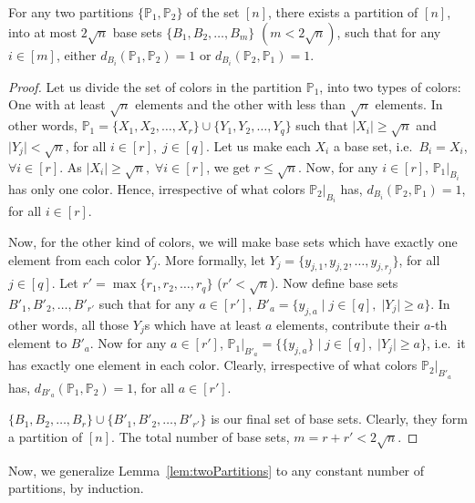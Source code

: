 \documentclass[final,oneeqnum, onethmnum, onefignum]{siamltex1213}
\renewcommand{\P}{\mathbb P}
\newcommand{\abs}[1]{\lvert #1 \rvert}
\begin{document}
\begin{lemma}
\label{lem:twoPartitions}
For any two partitions $\{ \P_1, \P_2 \}$ of the set $[n] $,
there exists a partition of $[n]$,
into at most $2 \sqrt{n}$ base sets $\{B_1, B_2, \dots, B_{m} \}$
 $(m < 2 \sqrt{n})$,
such that for any $i \in [m]$,
either $d_{B_i}(\P_1, \P_2) = 1$ or $d_{B_i}(\P_2, \P_1) =1$.
\end{lemma}          
\begin{proof}
Let us divide the set of colors in the partition $\P_1$, into 
two types of colors: One with at least $\sqrt{n}$ elements and the other with less than
$\sqrt{n}$ elements. 
In other words, $\P_1 = \{X_1, X_2, \dots, X_{r} \} \cup \{ Y_1, Y_2, \dots, Y_{q}\}$
such that $\abs{X_i} \geq \sqrt{n}$ and $\abs{Y_j} < \sqrt{n}$,
 for all $i \in [r], \; j \in [q]$.
Let us make each $X_i$ a base set, i.e.\ $B_i = X_i$, $\forall i \in [r]$. 
As $\abs{X_i} \geq \sqrt{n}, \; \forall i \in [r]$, we get $r \leq \sqrt{n}$.
Now, for any $i \in [r]$, $\P_1|_{B_i}$ has only one color.
Hence, irrespective of what colors $\P_2|_{B_i}$ has, 
$d_{B_i}(\P_2, \P_1) = 1$, for all $i \in [r]$.

Now, for the other kind of colors, we will make base sets  
which have exactly one element from each color $Y_j$.
More formally, let $Y_j = \{y_{j,1}, y_{j,2}, \dots, y_{j, r_j} \}$, for all $j \in [q]$.
Let $r' = \max\{ r_1, r_2, \dots, r_q\}$ ($r' < \sqrt{n}$). 
Now define base sets $B'_1, B'_2, \dots, B'_{r'}$ such that
for any $a \in [r']$, $B'_a = \{y_{j,a} \mid j \in [q], \; \abs{Y_j} \geq a \} $. 
In other words, all those $Y_j$s which have at least $a$ elements, contribute
their $a$-th element to $B'_a$.
Now for any $a \in [r']$, $\P_1|_{B'_a} = \{ \{y_{j,a}\} \mid j \in [q], \; \abs{Y_j} \geq a \}$,
i.e.\ it has exactly one element in each color. 
Clearly, irrespective of what colors $\P_2|_{B'_a}$ has, 
$d_{B'_a} (\P_1,\P_2) = 1$, for all $a \in [r']$.

$\{B_1, B_2, \dots, B_r\} \cup \{B'_1, B'_2, \dots, B'_{r'}\}$ is our final set of base sets. 
Clearly,  they form a partition of $[n]$. 
The total number of base sets, $m = r + r' < 2 \sqrt{n}$.

\end{proof}

Now, we generalize Lemma~\ref{lem:twoPartitions} to any constant number of partitions, by induction. 
\end{document}
